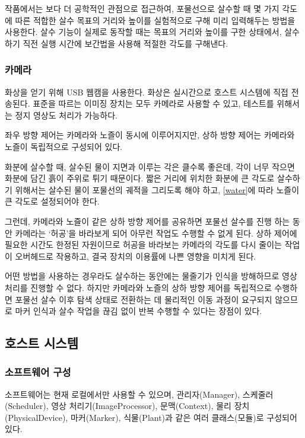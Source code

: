 \documentclass[chapter,11pt,oneside,openany]{xoblivoir}
\begin{document}
작품에서는 보다 더 공학적인 관점으로 접근하여, 포물선으로 살수할 때 몇 가지 각도에 따른 적합한 살수 목표의 거리와 높이를 실험적으로 구해 미리 입력해두는 방법을 사용한다.
살수 기능이 실제로 동작할 때는 목표의 거리와 높이를 구한 상태에서,
살수하기 직전 실행 시간에 보간법을 사용해 적절한 각도를 구해낸다.


\subsubsection{카메라}
\label{cam}
화상을 얻기 위해 USB 웹캠을 사용한다. 화상은 실시간으로 호스트 시스템에 직접 전송된다. 표준을 따르는 이미징 장치는 모두 카메라로 사용할 수 있고, 테스트를 위해서는
정지 영상도 처리가 가능하다.

좌우 방향 제어는 카메라와 노즐이 동시에 이루어지지만, 상하 방향 제어는 카메라와 노즐이 독립적으로 구성되어 있다.

화분에 살수할 때, 살수된 물이 지면과 이루는 각은 클수록 좋은데,
각이 너무 작으면 화분에 담긴 흙이 주위로 튀기 때문이다.
짧은 거리에 위치한 화분에 큰 각도로 살수하기 위해서는 살수된 물이
포물선의 궤적을 그리도록 해야 하고, \ref{water}에 따라 노즐이 큰 각도로
설정되어야 한다.

그런데, 카메라와 노즐이 같은 상하 방향 제어를 공유하면 포물선 살수를 진행 하는
동안 카메라는 `허공'을 바라보게 되어 아무런 작업도 수행할 수 없게 된다.
상하 제어에 필요한 시간도 한정된 자원이므로 허공을 바라보는 카메라의
각도를 다시 줄이는 작업이 오버헤드로 작용하고, 결국 장치의 이용률에
나쁜 영향을 미치게 된다.

어떤 방법을 사용하는 경우라도 살수하는 동안에는 물줄기가 인식을 방해하므로
영상 처리를 진행할 수 없다. 하지만 카메라와 노즐의 상하 방향 제어를
독립적으로 수행하면 포물선 살수 이후 탐색 상태로 전환하는 데
물리적인 이동 과정이 요구되지 않으므로
마커 인식과 살수 작업을 끊김 없이 반복 수행할 수 있다는 장점이 있다.


\subsection{호스트 시스템}

\subsubsection{소프트웨어 구성}
소프트웨어는 현재 로컬에서만 사용할 수 있으며,
관리자(Manager), 스케줄러(Scheduler), 영상 처리기(ImageProcessor), 문맥(Context),
물리 장치(PhysicalDevice), 마커(Marker), 식물(Plant)과 같은 여러 클래스(모듈)로 구성되어있다.
\end{document}
